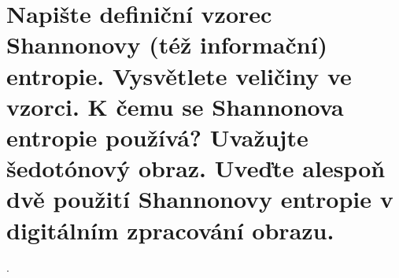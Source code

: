 \section{Napište definiční vzorec Shannonovy (též informační) entropie. Vysvětlete veličiny ve vzorci. K čemu se 
Shannonova entropie používá? Uvažujte šedotónový obraz. Uveďte alespoň dvě použití Shannonovy entropie v digitálním 
zpracování obrazu.}.